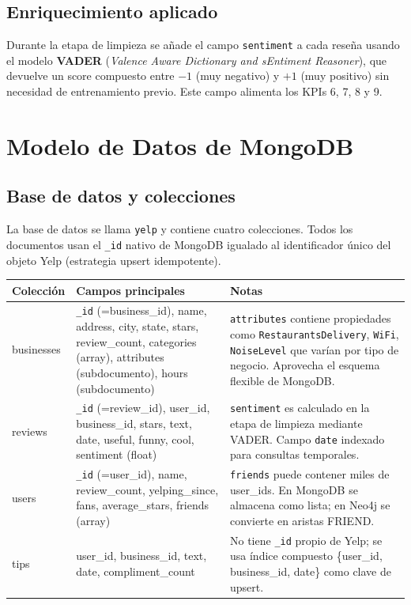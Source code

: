 \documentclass[12pt,a4paper]{article}
\begin{document}
\subsection{Enriquecimiento aplicado}

Durante la etapa de limpieza se añade el campo \texttt{sentiment} a cada reseña usando
el modelo \textbf{VADER} (\textit{Valence Aware Dictionary and sEntiment Reasoner}),
que devuelve un score compuesto entre $-1$ (muy negativo) y $+1$ (muy positivo)
sin necesidad de entrenamiento previo. Este campo alimenta los KPIs 6, 7, 8 y 9.

\section{Modelo de Datos de MongoDB}

\subsection{Base de datos y colecciones}

La base de datos se llama \texttt{yelp} y contiene cuatro colecciones. Todos los
documentos usan el \texttt{\_id} nativo de MongoDB igualado al identificador único
del objeto Yelp (estrategia upsert idempotente).

\begin{longtable}{>{\ttfamily}p{2.5cm} p{4.5cm} p{6cm}}
\toprule
\normalfont\textbf{Colección} & \textbf{Campos principales} & \textbf{Notas} \\
\midrule
businesses &
\texttt{\_id} (=business\_id), name, address, city, state, stars, review\_count, categories (array), attributes (subdocumento), hours (subdocumento) &
\texttt{attributes} contiene propiedades como \texttt{RestaurantsDelivery}, \texttt{WiFi}, \texttt{NoiseLevel} que varían por tipo de negocio. Aprovecha el esquema flexible de MongoDB. \\[0.5em]

reviews &
\texttt{\_id} (=review\_id), user\_id, business\_id, stars, text, date, useful, funny, cool, sentiment (float) &
\texttt{sentiment} es calculado en la etapa de limpieza mediante VADER. Campo \texttt{date} indexado para consultas temporales. \\[0.5em]

users &
\texttt{\_id} (=user\_id), name, review\_count, yelping\_since, fans, average\_stars, friends (array) &
\texttt{friends} puede contener miles de user\_ids. En MongoDB se almacena como lista; en Neo4j se convierte en aristas FRIEND. \\[0.5em]

tips &
user\_id, business\_id, text, date, compliment\_count &
No tiene \texttt{\_id} propio de Yelp; se usa índice compuesto \{user\_id, business\_id, date\} como clave de upsert. \\
\bottomrule
\end{longtable}
\end{document}
